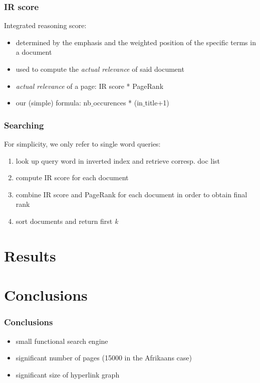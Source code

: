 \documentclass[10pt]{beamer}
\begin{document}
\begin{frame}
\frametitle{IR score}
Integrated reasoning score:

\begin{itemize}
\item determined by the emphasis and the weighted position of the specific terms in a document
\item used to compute the \emph{actual relevance}  of said document
\item \emph{actual relevance} of a page: IR score * PageRank
\item our (simple) formula: nb$\_$occurences * (in$\_$title+1)
\end{itemize}
\end{frame}

\begin{frame}
\frametitle{Searching}

For simplicity, we only refer to single word queries:
\begin{enumerate}
\item look up query word in inverted index and retrieve corresp. doc list
\item compute IR score for each document
\item combine IR score and PageRank for each document in order to obtain final rank
\item sort documents and return first \emph{k}
\end{enumerate}
\end{frame}






\section{Results}



\section{Conclusions}
\begin{frame}
\frametitle{Conclusions}

\begin{itemize}
\item small functional search engine
\item significant number of pages (15000 in the Afrikaans case)
\item significant size of hyperlink graph
\end{itemize}
\end{frame}
\end{document}
